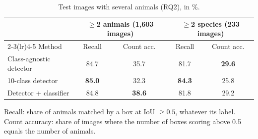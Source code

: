 \begin{table}[H]
\centering
\caption{Test images with several animals (RQ2), in \%.}
\label{tab:multi_animal}
\begin{threeparttable}
\small
\begin{tabular}{lcccc}
\toprule
 & \multicolumn{2}{c}{$\geq$2 animals (1,603 images)} & \multicolumn{2}{c}{$\geq$2 species (233 images)} \\
\cmidrule(lr){2-3}\cmidrule(lr){4-5}
Method & Recall & Count acc. & Recall & Count acc. \\
\midrule
Class-agnostic detector & 84.7 & 35.7 & 81.7 & \textbf{29.6} \\
10-class detector & \textbf{85.0} & 32.3 & \textbf{84.3} & 25.8 \\
Detector + classifier & 84.8 & \textbf{38.6} & 81.8 & 29.2 \\
\bottomrule
\end{tabular}
\par\smallskip
{\footnotesize\noindent Recall: share of animals matched by a box at IoU $\geq 0.5$, whatever its label. Count accuracy: share of images where the number of boxes scoring above 0.5 equals the number of animals.\par}
\end{threeparttable}
\end{table}
